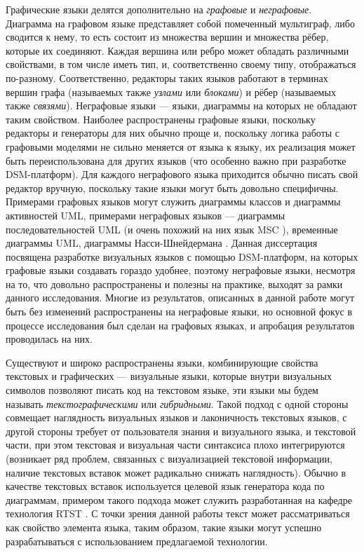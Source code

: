 Графические языки делятся дополнительно на \textit{графовые} и \textit{неграфовые}. Диаграмма на 
графовом языке представляет собой помеченный мультиграф, либо сводится к нему, то 
есть состоит из множества вершин и множества рёбер, которые их соединяют. 
Каждая вершина или ребро может обладать различными свойствами, в том числе иметь 
тип, и, соответственно своему типу, отображаться по-разному. Соответственно,
 редакторы таких языков работают в терминах вершин графа (называемых также 
\textit{узлами} или \textit{блоками}) и рёбер (называемых также \textit{связями}). Неграфовые языки --- 
языки, диаграммы на которых не обладают таким свойством. Наиболее распространены 
графовые языки, поскольку редакторы и генераторы для них обычно проще и, 
поскольку логика работы с графовыми моделями не сильно меняется от языка к 
языку, их реализация может быть переиспользована для других языков (что особенно 
важно при разработке DSM-платформ). Для каждого неграфового языка приходится 
обычно писать свой редактор вручную, поскольку такие языки могут быть довольно 
специфичны. Примерами графовых языков могут служить диаграммы классов и 
диаграммы активностей UML, примерами неграфовых языков --- диаграммы 
последовательностей UML (и очень похожий на них язык MSC
), временные диаграммы UML, диаграммы Насси-Шнейдермана
. Данная диссертация посвящена разработке визуальных языков с помощью 
DSM-платформ, на которых графовые языки создавать гораздо удобнее, поэтому 
неграфовые языки, несмотря на то, что довольно распространены и полезны на 
практике, выходят за рамки данного исследования. Многие из результатов, 
описанных в данной работе могут быть без изменений распространены на неграфовые 
языки, но основной фокус в процессе исследования был сделан на графовых языках, 
и апробация результатов проводилась на них.

Существуют и широко распространены языки, комбинирующие свойства текстовых и 
графических --- визуальные языки, которые внутри визуальных символов позволяют 
писать код на текстовом языке, эти языки мы будем называть \textit{текстографическими} или \textit{гибридными}. 
Такой подход с одной стороны совмещает наглядность визуальных языков и лаконичность текстовых языков, с другой стороны 
требует от пользователя знания и визуального языка, и текстовой части, при этом 
текстовая и визуальная части синтаксиса плохо интегрируются (возникает ряд 
проблем, связанных с визуализацией текстовой информации, наличие текстовых
вставок может радикально снижать наглядность). Обычно в качестве текстовых 
вставок используется целевой язык генератора кода по диаграммам, примером такого 
подхода может служить разработанная на кафедре технология RTST 
. С точки зрения данной работы текст может рассматриваться как свойство элемента 
языка, таким образом, такие языки могут успешно разрабатываться с использованием 
предлагаемой технологии.

